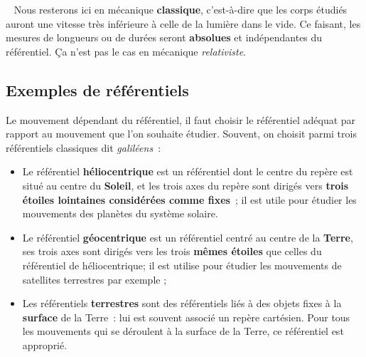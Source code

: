 \documentclass[../main/main.tex]{subfiles}
\begin{document}
\begin{bror}{~}
    Nous resterons ici en mécanique \textbf{classique}, c'est-à-dire que les
    corps étudiés auront une vitesse très inférieure à celle de la lumière dans
    le vide. Ce faisant, les mesures de longueurs ou de durées seront
    \textbf{absolues} et indépendantes du référentiel. Ça n'est pas le cas en
    mécanique \textit{relativiste}.
\end{bror}

\subsection{Exemples de référentiels}

Le mouvement dépendant du référentiel, il faut choisir le référentiel adéquat
par rapport au mouvement que l'on souhaite étudier. Souvent, on choisit parmi
trois référentiels classiques dit \textit{galiléens}~: \bigbreak

\begin{itemize}

    \item Le référentiel \textbf{héliocentrique} est un référentiel dont le
        centre du repère est situé au centre du \textbf{Soleil}, et les trois
        axes du repère sont dirigés vers \textbf{trois étoiles lointaines
        considérées comme fixes}~; il est utile pour étudier les mouvements des
        planètes du système solaire.

    \item Le référentiel \textbf{géocentrique} est un référentiel centré au
        centre de la \textbf{Terre}, ses trois axes sont dirigés vers les trois
        \textbf{mêmes étoiles} que celles du référentiel de héliocentrique; il
        est utilise pour étudier les mouvements de satellites terrestres par
        exemple ;

    \item Les référentiels \textbf{terrestres} sont des référentiels liés à des
        objets fixes à la \textbf{surface} de la Terre~: lui est souvent associé
        un repère cartésien. Pour tous les mouvements qui se déroulent à la
        surface de la Terre, ce référentiel est approprié.
\end{itemize}
\end{document}

